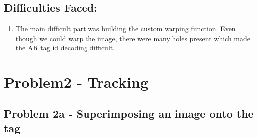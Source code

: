 \documentclass[12pt]{article}
\begin{document}
\subsection{Difficulties Faced:}
\begin{enumerate}
\item The main difficult part was building the custom warping function. Even though we could warp the image, there were many holes present which made the AR tag id decoding difficult.
\end{enumerate}



\section{Problem2 - Tracking}
\subsection{Problem 2a - Superimposing an image onto the tag}
\end{document}
